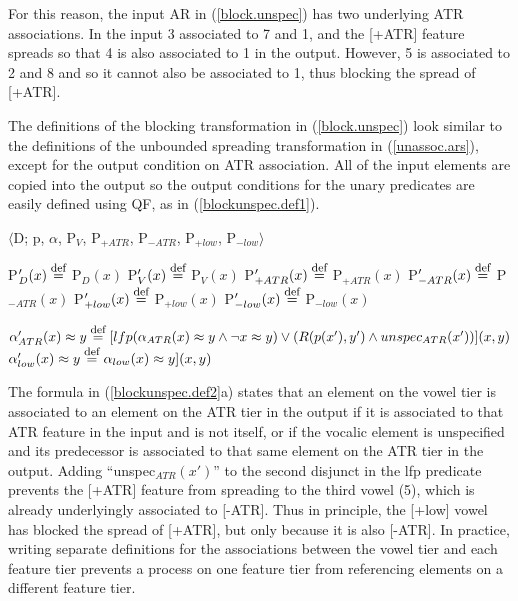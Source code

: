\documentclass[,doc,floatsintext]{apa6}
\def\defeq{\mathrel{\buildrel \mbox{\footnotesize def} \over =}}
\theoremstyle{definition}
\theoremstyle{definition}
\theoremstyle{definition}
\theoremstyle{remark}
\begin{document}
\noindent For this reason, the input AR in (\ref{block.unspec}) has two
underlying ATR associations. In the input 3 associated to 7 and 1, and
the {[}+ATR{]} feature spreads so that 4 is also associated to 1 in the
output. However, 5 is associated to 2 and 8 and so it cannot also be
associated to 1, thus blocking the spread of {[}+ATR{]}.

The definitions of the blocking transformation in (\ref{block.unspec})
look similar to the definitions of the unbounded spreading
transformation in (\ref{unassoc.ars}), except for the output condition
on ATR association. All of the input elements are copied into the output
so the output conditions for the unary predicates are easily defined
using QF, as in (\ref{blockunspec.def1}).

\begin{exe}
  \ex $\langle$D; p, $\alpha$, P$_V$, P$_{+ATR}$, P$_{-ATR}$, P$_{+low}$, P$_{-low}\rangle$\label{blockunspec.def1}
  \begin{xlist}
  \ex P$'_{D}(x) \defeq$ P$_{D}(x)$ \hspace{1.07in} P$'_{V}(x) \defeq$ P$_{V}(x)$
  \ex P$'_{+ATR}(x) \defeq$ P$_{+ATR}(x)$ \hspace{0.65in} P$'_{-ATR}(x) \defeq$ P$_{-ATR}(x)$
  \ex P$'_{+low}(x) \defeq$ P$_{+low}(x)$ \hspace{0.75in} P$'_{-low}(x) \defeq$ P$_{-low}(x)$
  \end{xlist}
  
\ex \label{blockunspec.def2}
  \begin{xlist}
  \ex $\alpha_{ATR}'(x)\approx y \defeq [lfp(\alpha_{ATR}(x)\approx y\wedge \neg x\approx y) \vee (R(p(x'), y')\wedge unspec_{ATR}(x'))](x,y)$
  \ex $\alpha_{low}'(x)\approx y \defeq \alpha_{low}(x)\approx y](x,y)$
  \end{xlist}
\end{exe}

\noindent The formula in (\ref{blockunspec.def2}a) states that an
element on the vowel tier is associated to an element on the ATR tier in
the output if it is associated to that ATR feature in the input and is
not itself, or if the vocalic element is unspecified and its predecessor
is associated to that same element on the ATR tier in the output. Adding
\enquote{unspec\(_{ATR}(x')\)} to the second disjunct in the lfp
predicate prevents the {[}+ATR{]} feature from spreading to the third
vowel (5), which is already underlyingly associated to {[}-ATR{]}. Thus
in principle, the {[}+low{]} vowel has blocked the spread of {[}+ATR{]},
but only because it is also {[}-ATR{]}. In practice, writing separate
definitions for the associations between the vowel tier and each feature
tier prevents a process on one feature tier from referencing elements on
a different feature tier.
\end{document}
